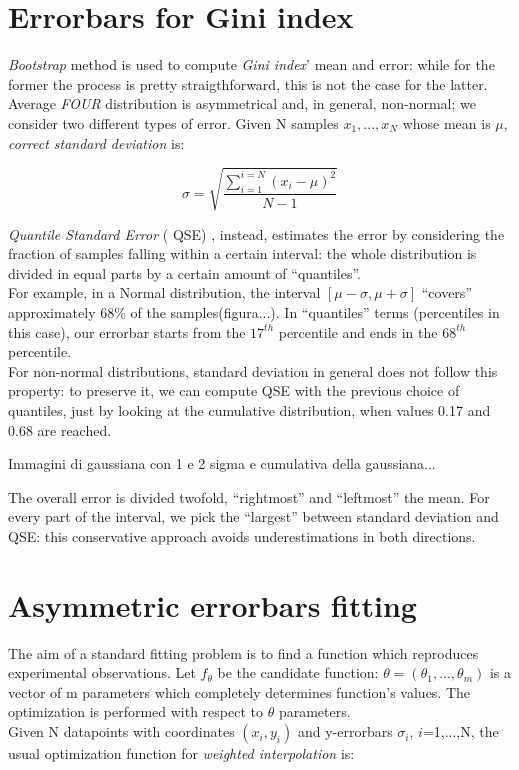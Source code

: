 \appendix
\section{Errorbars for Gini index}

\textit{Bootstrap} method \cite{bootstrap} is used to compute \textit{Gini index}' mean and error: while for the former the process is pretty straigthforward, this is not the case for the latter.
Average \textit{FOUR} distribution is asymmetrical and, in general, non-normal; we consider two different types of error.
Given N samples ${x_1,...,x_N}$ whose mean is $\mu$, \textit{correct standard deviation} is:

$$
\sigma=\sqrt{\frac{\sum_{i=1}^{i=N}(x_i - \mu)^2}{N-1}}
$$


\textit{Quantile Standard Error} (	QSE) \cite{quantile}, instead, estimates the error by considering the fraction of samples falling within a certain interval: the whole distribution is divided in equal parts by a certain amount of ``quantiles''.\\
For example, in a Normal distribution, the interval $[\mu -\sigma, \mu +\sigma]$ ``covers'' approximately 68\% of the samples(figura...).
In ``quantiles'' terms (percentiles in this case), our errorbar starts from the $17^{th}$ percentile and ends in the $68^{th}$ percentile.\\
For non-normal distributions, standard deviation in general does not follow this property: to preserve it, we can compute QSE with the previous choice of quantiles, just by looking at the cumulative distribution, when values 0.17 and 0.68 are reached.

Immagini di gaussiana con 1 e 2 sigma e cumulativa della gaussiana...

The overall error is divided twofold, ``rightmost'' and ``leftmost''  the mean. For every part of the interval, we pick the ``largest'' between standard deviation and QSE: this conservative approach avoids underestimations in both directions.




\section{Asymmetric errorbars fitting}
The aim of a standard fitting problem is to find a function which reproduces experimental observations.
Let $f_{\theta}$ be the candidate function: $\theta=(\theta_1,...,\theta_m)$ is a vector of m parameters which completely determines function's values.
The optimization is performed with respect to $\theta$ parameters.\\
Given N datapoints with coordinates ${(x_i,y_i)}$ and y-errorbars $\sigma_i$, $i$=1,...,N, the usual optimization function for \textit{weighted interpolation} \cite{interpolation} is:

